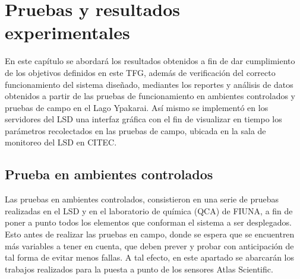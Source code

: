 \chapter[Pruebas y resultados experimentales]{ Pruebas y resultados experimentales}
\pagestyle{fancy}

En este cap\'itulo se abordar\'a los resultados obtenidos a fin de dar cumplimiento de los objetivos definidos en este TFG, adem\'as de verificación del correcto funcionamiento del sistema dise\~nado, mediantes los reportes y an\'alisis de datos obtenidos a partir de las  pruebas de funcionamiento en ambientes controlados y pruebas de campo en el Lago Ypakarai.  
 As\'i mismo se implement\'o en los servidores del LSD una interfaz gr\'afica con el fin de visualizar en tiempo los parámetros recolectados en las pruebas de campo, ubicada en la sala de monitoreo del LSD en CITEC.

\section{Prueba en ambientes controlados}
Las pruebas en ambientes controlados, consistieron en una serie de pruebas realizadas en el LSD y en el laboratorio de qu\'imica (QCA) de FIUNA, a fin de poner a punto todos los elementos que conforman el sistema a ser desplegados. 
Esto antes de realizar las pruebas en campo, donde se espera que se encuentren m\'as variables a tener en cuenta, que deben prever y probar con anticipaci\'on de tal forma de evitar menos fallas.
A tal efecto, en este apartado se abarcar\'an los trabajos realizados para la puesta a punto de los sensores Atlas Scientific.

